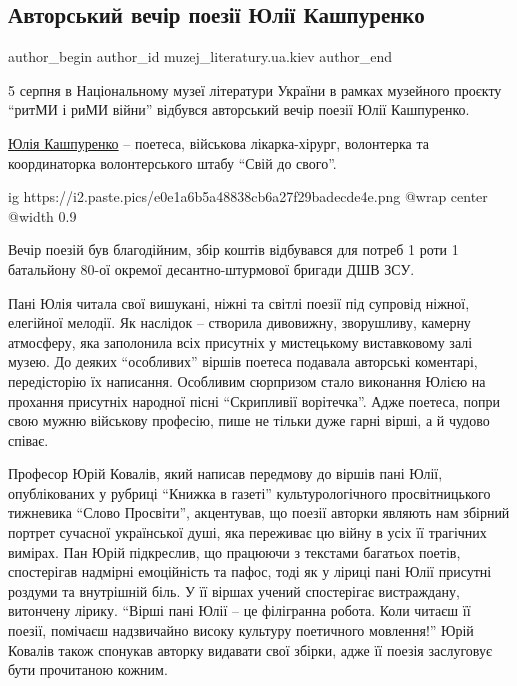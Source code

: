  
 
 
 
 

\subsection{Авторський вечір поезії Юлії Кашпуренко}
\label{sec:07_08_2023.fb.muzej_literatury.ua.kiev.1.avtorskij_vechir_julii_kashpurenko}

\ifcmt
 author_begin
   author_id muzej_literatury.ua.kiev
 author_end
\fi

5 серпня в Національному музеї літератури України в рамках музейного проєкту
\enquote{ритМИ і риМИ війни} відбувся авторський вечір поезії Юлії Кашпуренко. 

\href{https://www.facebook.com/profile.php?id=100002050349167}{Юлія Кашпуренко} – поетеса, військова лікарка-хірург, волонтерка та
координаторка волонтерського штабу \enquote{Свій до свого}.

\ifcmt
  ig https://i2.paste.pics/e0e1a6b5a48838cb6a27f29badecde4e.png
  @wrap center
  @width 0.9
\fi

Вечір поезій був благодійним, збір коштів відбувався для потреб 1 роти 1
батальйону 80-ої окремої десантно-штурмової бригади ДШВ ЗСУ.

Пані Юлія читала свої вишукані, ніжні та світлі поезії під супровід ніжної,
елегійної мелодії. Як наслідок – створила дивовижну, зворушливу, камерну
атмосферу, яка заполонила всіх присутніх у мистецькому виставковому залі музею.
До деяких \enquote{особливих} віршів поетеса подавала авторські коментарі, передісторію
їх написання. Особливим сюрпризом стало виконання Юлією на прохання присутніх
народної пісні \enquote{Скрипливії ворітечка}. Адже поетеса, попри свою мужню військову
професію, пише не тільки дуже гарні вірші, а й чудово співає. 

Професор Юрій Ковалів, який написав передмову до віршів пані Юлії,
опублікованих у рубриці \enquote{Книжка в газеті} культурологічного просвітницького
тижневика \enquote{Слово Просвіти}, акцентував, що поезії авторки являють нам збірний
портрет сучасної української душі, яка переживає цю війну в усіх її трагічних
вимірах. Пан Юрій підкреслив, що працюючи з текстами багатьох поетів,
спостерігав надмірні емоційність та пафос, тоді як у ліриці пані Юлії присутні
роздуми та внутрішній біль. У її віршах учений спостерігає вистраждану,
витончену лірику. \enquote{Вірші пані Юлії – це філігранна робота. Коли читаєш її
поезії, помічаєш надзвичайно високу культуру поетичного мовлення!} Юрій Ковалів
також спонукав авторку видавати свої збірки, адже її поезія заслуговує бути
прочитаною кожним. 

